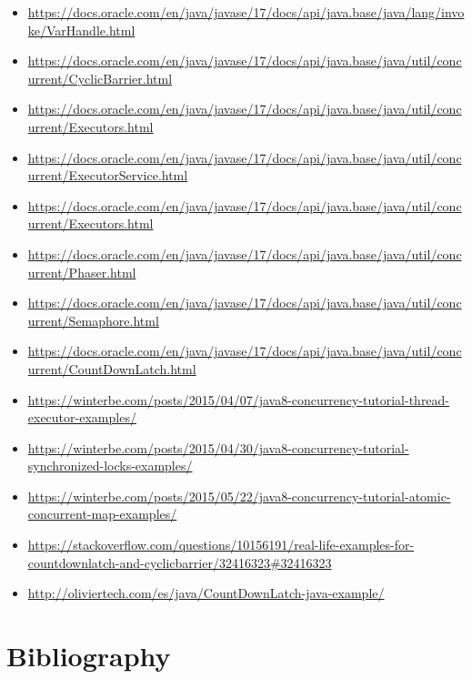 \documentclass{latex/classes/thesis}
\begin{document}
\begin{itemize}
\item \url{https://docs.oracle.com/en/java/javase/17/docs/api/java.base/java/lang/invoke/VarHandle.html}
\item \url{https://docs.oracle.com/en/java/javase/17/docs/api/java.base/java/util/concurrent/CyclicBarrier.html}
\item \url{https://docs.oracle.com/en/java/javase/17/docs/api/java.base/java/util/concurrent/Executors.html}
\item \url{https://docs.oracle.com/en/java/javase/17/docs/api/java.base/java/util/concurrent/ExecutorService.html}
\item \url{https://docs.oracle.com/en/java/javase/17/docs/api/java.base/java/util/concurrent/Executors.html}
\item \url{https://docs.oracle.com/en/java/javase/17/docs/api/java.base/java/util/concurrent/Phaser.html}
\item \url{https://docs.oracle.com/en/java/javase/17/docs/api/java.base/java/util/concurrent/Semaphore.html}
\item \url{https://docs.oracle.com/en/java/javase/17/docs/api/java.base/java/util/concurrent/CountDownLatch.html}
\item \url{https://winterbe.com/posts/2015/04/07/java8-concurrency-tutorial-thread-executor-examples/}
\item \url{https://winterbe.com/posts/2015/04/30/java8-concurrency-tutorial-synchronized-locks-examples/}
\item \url{https://winterbe.com/posts/2015/05/22/java8-concurrency-tutorial-atomic-concurrent-map-examples/}
\item \url{https://stackoverflow.com/questions/10156191/real-life-examples-for-countdownlatch-and-cyclicbarrier/32416323\#32416323}
\item \url{http://oliviertech.com/es/java/CountDownLatch-java-example/}
\end{itemize}


\chapter{Bibliography}
\label{sec:orgb76d398}


\end{document}
